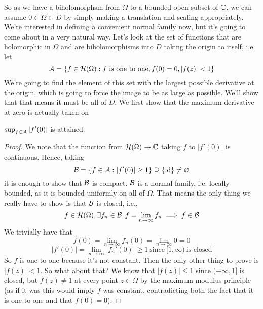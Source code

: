 \documentclass{article}
\begin{document}
So as we have a biholomorphsm from \(\Omega\) to a bounded open subset of \(\mathbb{C}\), we can assume \(0 \in \Omega \subset D\) by simply making a translation and scaling appropriately. We're interested in defining a convenient normal family now, but it's going to come about in a very natural way. Let's look at the set of functions that are holomorphic in \(\Omega\) and are biholomorphisms into \(D\) taking the origin to itself, i.e. let
\begin{equation}\mathcal{A} = \{f \in \mathcal{H}(\Omega) : f \ \text{is one to one}, f(0) = 0, |f(z)| < 1\}\end{equation}
We're going to find the element of this set with the largest possible derivative at the origin, which is going to force the image to be as large as possible. We'll show that that means it must be all of \(D\).
We first show that the maximum derivative at zero is actually taken on
\begin{lemma}
\(\sup_{f \in \mathcal{A}}|f'(0)|\) is attained.
\end{lemma}
\begin{proof}
We note that the function from \(\mathcal{H}(\Omega) \to \mathbb{C}\) taking \(f\) to \(|f'(0)|\) is continuous. Hence, taking
\begin{equation}\mathcal{B} = \{f \in \mathcal{A} : |f'(0) | \geq 1\} \supseteq \{\operatorname{id}\} \neq \varnothing\end{equation}
it is enough to show that \(\mathcal{B}\) is compact. \(\mathcal{B}\) is a normal family, i.e. locally bounded, as it is bounded uniformly on all of \(\Omega\). That means the only thing we really have to show is that \(\mathcal{B}\) is closed, i.e.,
\begin{equation}f \in \mathcal{H}(\Omega), \exists f_n \in \mathcal{B}, f = \lim_{n \to \infty}f_n \implies f \in \mathcal{B}\end{equation}
We trivially have that
\begin{equation}f(0) = \lim_{n \to \infty}f_n(0) = \lim_{n \to \infty}0 = 0\end{equation}
\begin{equation}|f'(0)| = \lim_{n \to \infty}|f_n'(0)| \geq 1 \ \text{since} \ [1, \infty) \ \text{is closed}\end{equation}
So \(f\) is one to one because it's not constant. Then the only other thing to prove is \(|f(z)| < 1\). So what about that? We know that \(|f(z)| \leq 1\) since \((-\infty, 1]\) is closed, but \(f(z) \neq 1\) at every point \(z \in \Omega\) by the maximum modulus principle (as if it was this would imply \(f\) was constant, contradicting both the fact that it is one-to-one and that \(f(0) = 0\)).
\end{proof}
\end{document}

